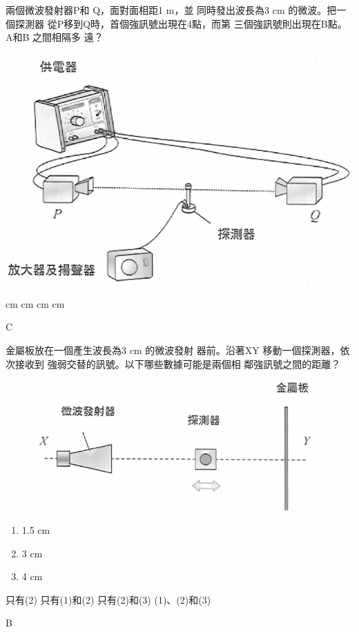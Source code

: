 {
    兩個微波發射器P和 Q，面對面相距1 m，並 同時發出波長為3 cm 的微波。把一個探測器 從P移到Q時，首個強訊號出現在4點，而第 三個強訊號則出現在B點。A和B 之間相隔多 遠？
    \begin{center}

        \includegraphics[width=.3\textwidth]{assets/158f4747.png}
    \end{center}
    \begin{choices}
         cm
         cm
         cm
         cm
    \end{choices}

}{\mckey C}

{
    金屬板放在一個產生波長為3 cm 的微波發射 器前。沿著XY 移動一個探測器，依次接收到 強弱交替的訊號。以下哪些數據可能是兩個相 鄰強訊號之間的距離？
    \begin{figure}[h!]
        \centering
        \includegraphics[width=.35\textwidth]{assets/e9d4c633.png}
    \end{figure}

    \begin{enumerate}[label=\sd]
        \item 1.5 cm
              \par
        \item 3 cm
              \par
        \item 4 cm
              \par
    \end{enumerate}


    \begin{choices}
        \choice 只有(2)
        \CorrectChoice 只有(1)和(2)
        \choice 只有(2)和(3)
        \choice (1)、(2)和(3)
    \end{choices}

}{\mckey B}